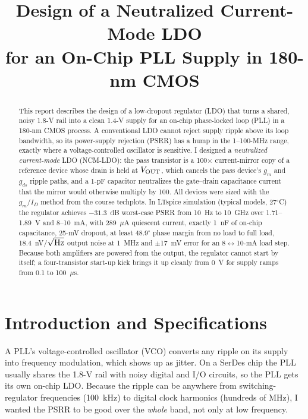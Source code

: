 \documentclass[conference]{IEEEtran}
\begin{document}
\title{Design of a Neutralized Current-Mode LDO\\for an On-Chip PLL Supply in 180-nm CMOS}
\author{
}
\maketitle

\begin{abstract}
This report describes the design of a low-dropout regulator (LDO) that turns a shared, noisy 1.8-V rail into a clean 1.4-V supply for an on-chip phase-locked loop (PLL) in a 180-nm CMOS process. A conventional LDO cannot reject supply ripple above its loop bandwidth, so its power-supply rejection (PSRR) has a hump in the 1--100-MHz range, exactly where a voltage-controlled oscillator is sensitive. I designed a \emph{neutralized current-mode} LDO (NCM-LDO): the pass transistor is a 100$\times$ current-mirror copy of a reference device whose drain is held at $V_{\mathrm{OUT}}$, which cancels the pass device's $g_m$ and $g_{ds}$ ripple paths, and a 1-pF capacitor neutralizes the gate--drain capacitance current that the mirror would otherwise multiply by 100. All devices were sized with the $g_m/I_D$ method from the course techplots. In LTspice simulation (typical models, 27$^\circ$C) the regulator achieves $-31.3$~dB worst-case PSRR from 10~Hz to 10~GHz over 1.71--1.89~V and 8--10~mA, with 289~$\mu$A quiescent current, exactly 1~nF of on-chip capacitance, 25-mV dropout, at least 48.9$^\circ$ phase margin from no load to full load, 18.4~nV/$\sqrt{\rm Hz}$ output noise at 1~MHz and $\pm$17~mV error for an 8$\leftrightarrow$10-mA load step. Because both amplifiers are powered from the output, the regulator cannot start by itself; a four-transistor start-up kick brings it up cleanly from 0~V for supply ramps from 0.1 to 100~$\mu$s.
\end{abstract}

\section{Introduction and Specifications}
A PLL's voltage-controlled oscillator (VCO) converts any ripple on its supply into frequency modulation, which shows up as jitter. On a SerDes chip the PLL usually shares the 1.8-V rail with noisy digital and I/O circuits, so the PLL gets its own on-chip LDO. Because the ripple can be anywhere from switching-regulator frequencies (100~kHz) to digital clock harmonics (hundreds of MHz), I wanted the PSRR to be good over the \emph{whole} band, not only at low frequency.
\end{document}
